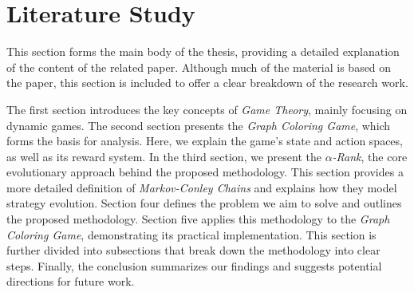 \section{Literature Study}

    This section forms the main body of the thesis, providing a detailed explanation of the content of the related paper. Although much of the material is based on the paper, this section is included to offer a clear breakdown of the research work.\tinydouble

    \noindent
    The first section introduces the key concepts of \emph{Game Theory}, mainly focusing on dynamic games. The second section presents the \emph{Graph Coloring Game}, which forms the basis for analysis. Here, we explain the game's state and action spaces, as well as its reward system. In the third section, we present the \emph{$\alpha$-Rank}, the core evolutionary approach behind the proposed methodology. This section provides a more detailed definition of \emph{Markov-Conley Chains} and explains how they model strategy evolution. Section four defines the problem we aim to solve and outlines the proposed methodology. Section five applies this methodology to the \emph{Graph Coloring Game}, demonstrating its practical implementation. This section is further divided into subsections that break down the methodology into clear steps. Finally, the conclusion summarizes our findings and suggests potential directions for future work.

\newpage


\newpage


\newpage


\newpage


\newpage


\newpage


\newpage